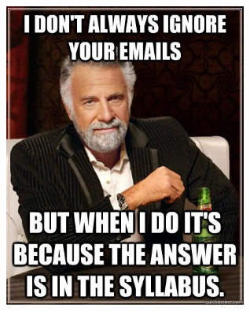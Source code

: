 \documentclass[11pt,containsverbatim,handout,xcolor=xelatex,dvipsnames,table]{beamer}
\begin{document}

\begin{frame}

\begin{center}
\includegraphics[width=0.6\textwidth]{figures/dont_always_syllabus.jpg}
\end{center}

\end{frame}

\end{document}

